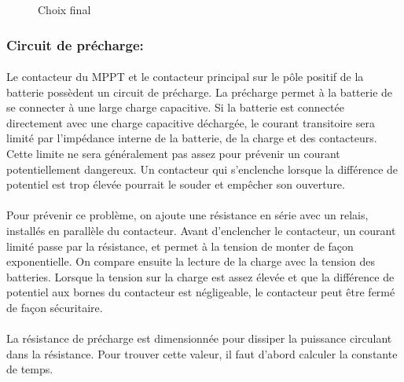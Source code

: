 		\begin{figure}[H]
			\centering
			\caption{Choix final}
			\label{fig:contactorsolfinal}
		\end{figure}

	\subsubsection*{Circuit de précharge:}
		\paragraph*{}
		Le contacteur du MPPT et le contacteur principal sur le pôle positif de la batterie possèdent un circuit de précharge. La précharge permet à la batterie de se connecter à une large charge capacitive. Si la batterie est connectée directement avec une charge capacitive déchargée, le courant transitoire sera limité par l'impédance interne de la batterie, de la charge et des contacteurs. Cette limite ne sera généralement pas assez pour prévenir un courant potentiellement dangereux. Un contacteur qui s'enclenche lorsque la différence de potentiel est trop élevée pourrait le souder et empêcher son ouverture\cite{System_Approach}.
		
		\paragraph*{}
		Pour prévenir ce problème, on ajoute une résistance en série avec un relais, installés en parallèle du contacteur. Avant d'enclencher le contacteur, un courant limité passe par la résistance, et permet à la tension de monter de façon exponentielle. On compare ensuite la lecture de la charge avec la tension des batteries. Lorsque la tension sur la charge est assez élevée et que la différence de potentiel aux bornes du contacteur est négligeable, le contacteur peut être fermé de façon sécuritaire\cite{System_Approach}.
		
		\paragraph*{}		
		La résistance de précharge est dimensionnée pour dissiper la puissance circulant dans la résistance. Pour trouver cette valeur, il faut d'abord calculer la constante de temps\cite{LiIonBms}.
	
